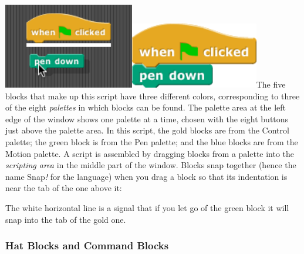 \includegraphics[width=2.24653in,height=1.46944in]{media/image7.png}\includegraphics[width=2.20833in,height=1.13889in]{media/image8.png}The
five blocks that make up this script have three different colors,
corresponding to three of the eight \emph{palettes} in which blocks can
be found. The palette area at the left edge of the window shows one
palette at a time, chosen with the eight buttons just above the palette
area. In this script, the gold blocks are from the Control palette; the
green block is from the Pen palette; and the blue blocks are from the
Motion palette. A script is assembled by dragging blocks from a palette
into the \emph{scripting area} in the middle part of the window. Blocks
snap together (hence the name Snap\emph{!} for the language) when you
drag a block so that its indentation is near the tab of the one above
it:

The white horizontal line is a signal that if you let go of the green
block it will snap into the tab of the gold one.

\subsubsection*{Hat Blocks and Command
Blocks}\label{hat-blocks-and-command-blocks}

